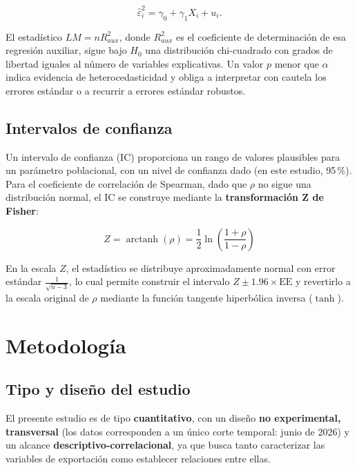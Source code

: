 \documentclass[12pt]{article}
\begin{document}
\[
\hat{\varepsilon}_i^2 = \gamma_0 + \gamma_1 X_i + u_i .
\]

El estadístico \(LM = n R^2_{aux}\), donde \(R^2_{aux}\) es el
coeficiente de determinación de esa regresión auxiliar, sigue bajo
\(H_0\) una distribución chi-cuadrado con grados de libertad iguales al
número de variables explicativas. Un valor \(p\) menor que \(\alpha\)
indica evidencia de heterocedasticidad y obliga a interpretar con
cautela los errores estándar o a recurrir a errores estándar robustos.

\subsection*{Intervalos de confianza}

Un intervalo de confianza (IC) proporciona un rango de valores
plausibles para un parámetro poblacional, con un nivel de confianza
dado (en este estudio, 95\,\%). Para el coeficiente de correlación de
Spearman, dado que \(\rho\) no sigue una distribución normal, el IC se
construye mediante la \textbf{transformación Z de Fisher}:

\[
Z = \operatorname{arctanh}(\rho) = \frac{1}{2}\ln\left(\frac{1+\rho}{1-\rho}\right)
\]

En la escala \(Z\), el estadístico se distribuye aproximadamente
normal con error estándar \(\frac{1}{\sqrt{n-3}}\), lo cual permite
construir el intervalo \(Z \pm 1.96 \times \text{EE}\) y revertirlo a
la escala original de \(\rho\) mediante la función tangente hiperbólica
inversa (\(\tanh\)).

\section{Metodología}

\subsection*{Tipo y diseño del estudio}

El presente estudio es de tipo \textbf{cuantitativo}, con un diseño
\textbf{no experimental, transversal} (los datos corresponden a un
único corte temporal: junio de 2026) y un alcance
\textbf{descriptivo-correlacional}, ya que busca tanto caracterizar
las variables de exportación como establecer relaciones entre ellas.
\end{document}
